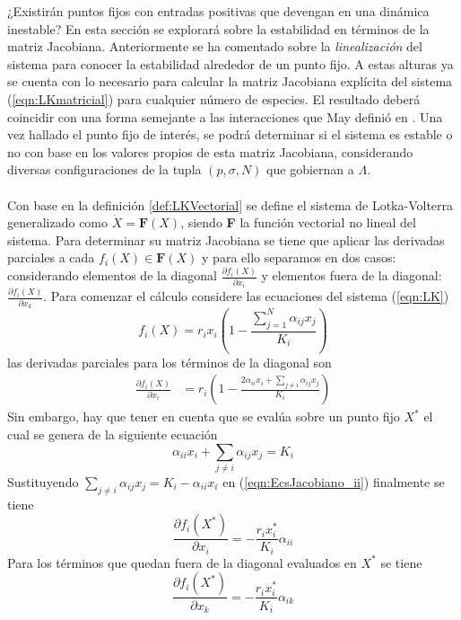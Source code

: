 ¿Existirán puntos fijos con entradas positivas que devengan en una dinámica inestable? En esta sección se explorará sobre la estabilidad en términos de la matriz Jacobiana. Anteriormente se ha comentado sobre la \textit{linealización} del sistema para conocer la estabilidad alrededor de un punto fijo. A estas alturas ya se cuenta con lo necesario para calcular la matriz Jacobiana explícita del sistema (\ref{eqn:LKmatricial}) para cualquier número de especies. El resultado deberá coincidir con una forma semejante a las interacciones que May definió en \cite{may2019stability}. Una vez hallado el punto fijo de interés, se podrá determinar si el sistema es estable o no con base en los valores propios de esta matriz Jacobiana, considerando diversas configuraciones de la tupla $(p,\sigma,N)$ que gobiernan a $\Lambda$.\\
\\
Con base en la definición \ref{def:LKVectorial} se define el sistema de Lotka-Volterra generalizado como $\dot{X}=\textbf{F}(X)$, siendo \textbf{F} la función vectorial no lineal del sistema. Para determinar su matriz Jacobiana se tiene que aplicar las derivadas parciales a cada $f_i(X)\in\mathbf{F}(X)$ y para ello separamos en dos casos: considerando elementos de la diagonal $\frac{\partial f_i(X)}{\partial x_i}$ y elementos fuera de la diagonal: $\frac{\partial f_i(X)}{\partial x_k}$. Para comenzar el cálculo considere las ecuaciones del sistema (\ref{eqn:LK}) 
$$
f_i(X) = r_ix_i\left (1-\frac{\sum_{j=1}^N \alpha_{ij}x_j}{K_i}\right )
$$
las derivadas parciales para los términos de la diagonal son
\begin{equation}\label{eqn:EcsJacobiano_ii}
	\begin{split}
			\frac{\partial f_i(X)}{\partial x_i} &= r_i \left (1-\frac{2\alpha_{ii}x_i+\sum_{j\neq i}\alpha_{ij}x_j}{K_i}\right )
	\end{split}
\end{equation}
Sin embargo, hay que tener en cuenta que se evalúa sobre un punto fijo $X^*$ el cual se genera de la siguiente ecuación  
$$\alpha_{ii}x_i+\sum_{j\neq i}\alpha_{ij}x_j=K_i$$
Sustituyendo $\sum_{j\neq i}\alpha_{ij}x_j=K_i-\alpha_{ii}x_i$ en (\ref{eqn:EcsJacobiano_ii}) finalmente se tiene
\begin{equation}
	\frac{\partial f_i(X^*)}{\partial x_i} = -\frac{r_ix_i^*}{K_i}\alpha_{ii}
\end{equation}
Para los términos que quedan fuera de la diagonal evaluados en $X^*$ se tiene
\begin{equation}\label{eqn:Jacobiano_ij}
		\frac{\partial f_i(X^*)}{\partial x_k} = -\frac{r_ix_i^*}{K_i}\alpha_{ik} 
\end{equation}
